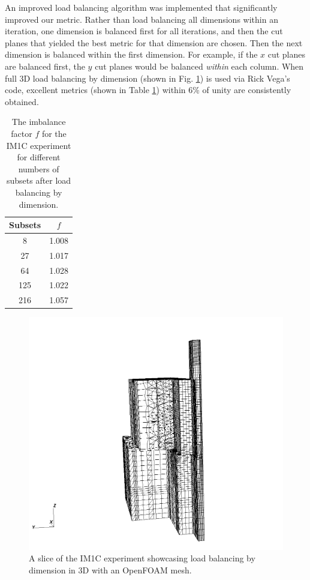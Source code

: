 \documentclass[11pt, letterpaper,titlepage,oneside]{article}
\begin{document}
An improved load balancing algorithm was implemented that significantly improved our metric. Rather than load balancing all dimensions within an iteration, one dimension is balanced first for all iterations, and then the cut planes that yielded the best metric for that dimension are chosen. Then the next dimension is balanced within the first dimension. For example, if the $x$ cut planes are balanced first, the $y$ cut planes would be balanced \textit{within} each column. When full 3D load balancing by dimension (shown in Fig. \ref{lbd}) is used via Rick Vega's code, excellent metrics (shown in Table \ref{lbd_f}) within 6\% of unity are consistently obtained.

\begin{table}[H]
\centering
\begin{tabular}{c c}
   \textbf{Subsets} & \textbf{$f$} \\
   \hline
   8 & 1.008 \\
  27 & 1.017 \\
  64 & 1.028 \\
 125 & 1.022 \\
 216 & 1.057 \\
\hline
\end{tabular}
\caption{The imbalance factor $f$ for the IM1C experiment for different numbers of subsets after load balancing by dimension.}
\label{lbd_f}
\end{table}

\begin{figure}[H]
\centering
\includegraphics[scale=0.5]{../figures/im1_foam_448.png}
\caption{A slice of the IM1C experiment showcasing load balancing by dimension in 3D with an OpenFOAM mesh.}
\label{lbd}
\end{figure}
\end{document}
